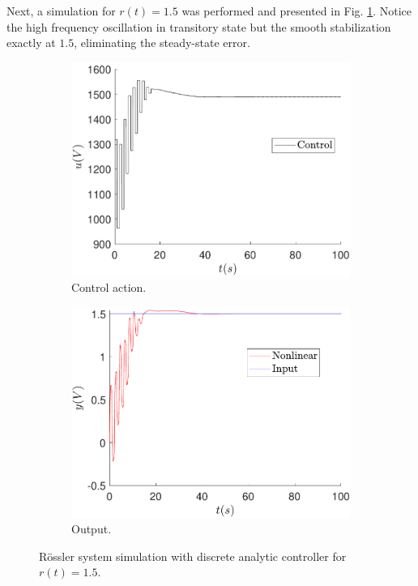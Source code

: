 	Next, a simulation for $r(t)=1.5$ was performed and presented in Fig. \ref{fig:anal_u_1_5}. Notice the high frequency oscillation in transitory state but the smooth stabilization exactly at $1.5$, eliminating the steady-state error.
	\begin{figure}
        \centering
        \begin{subfigure}[b]{0.475\textwidth}
            \centering
            \includegraphics[scale=0.425]{files/heuristic/analytic/control_analytic_u_1_5.pdf}
            \caption{Control action.}
        \end{subfigure}
        \vskip0.1cm
        \begin{subfigure}[b]{0.475\textwidth}   
            \centering 
            \includegraphics[scale=0.425]{files/heuristic/analytic/analytic_u_1_5.pdf}
            \caption{Output.}
        \end{subfigure}
        \caption{Rössler system simulation with discrete analytic controller for $r(t)=1.5$.}
        \label{fig:anal_u_1_5}
	\end{figure}
	
